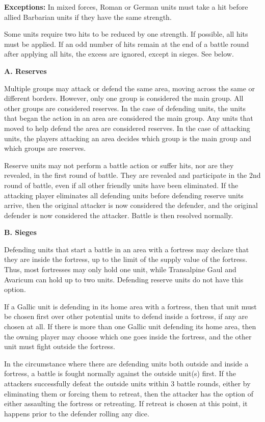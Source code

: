 \textbf{Exceptions:} In mixed forces, Roman or German units must take a hit before allied Barbarian units if they have the same strength.

Some units require two hits to be reduced by one strength. If possible, all hits must be applied. If an odd number of hits remain at the end of a battle round after applying all hits, the excess are ignored, except in sieges. See below.

\textbf{A. Reserves}

Multiple groups may attack or defend the same area, moving across the same or different borders. However, only one group is considered the main group. All other groups are considered reserves. In the case of defending units, the units that began the action in an area are considered the main group. Any units that moved to help defend the area are considered reserves. In the case of attacking units, the players attacking an area decides which group is the main group and which groups are reserves.

Reserve units may not perform a battle action or suffer hits, nor are they revealed, in the first round of battle. They are revealed and participate in the 2nd round of battle, even if all other friendly units have been eliminated. If the attacking player eliminates all defending units before defending reserve units arrive, then the original attacker is now considered the defender, and the original defender is now considered the attacker. Battle is then resolved normally.

\textbf{B. Sieges}
\par
Defending units that start a battle in an area with a fortress may declare that they are inside the fortress, up to the limit of the supply value of the fortress. Thus, most fortresses may only hold one unit, while Transalpine Gaul and Avaricum can hold up to two units. Defending reserve units do not have this option.

If a Gallic unit is defending in its home area with a fortress, then that unit must be chosen first over other potential units to defend inside a fortress, if any are chosen at all. If there is more than one Gallic unit defending its home area, then the owning player may choose which one goes inside the fortress, and the other unit must fight outside the fortress.

In the circumstance where there are defending units both outside and inside a fortress, a battle is fought normally against the outside unit(s) first. If the attackers successfully defeat the outside units within 3 battle rounds, either by eliminating them or forcing them to retreat, then the attacker has the option of either assaulting the fortress or retreating. If retreat is chosen at this point, it happens prior to the defender rolling any dice.

